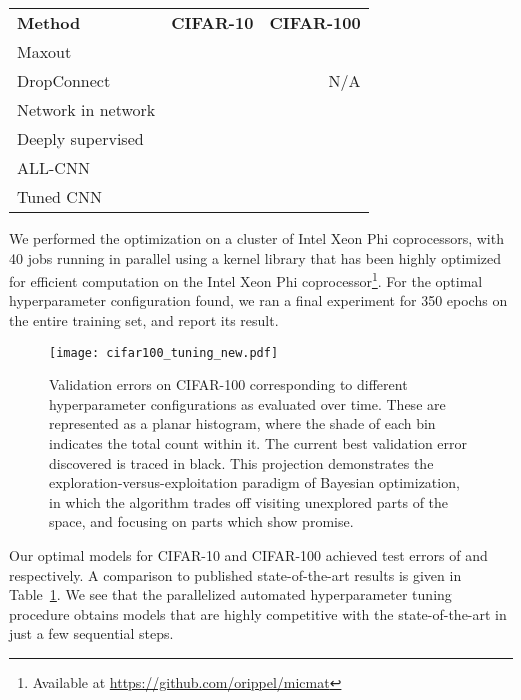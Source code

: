 \documentclass{article}
\begin{document}
\begin{table}[t!]
  \centering
  \begin{tabular}[b]{lrr}
    \toprule
    {\bf Method} & {\bf CIFAR-10} & {\bf CIFAR-100}\\\cmidrule(r){1-3}Maxout &  &  \\
    DropConnect &  & N/A \\
    Network in network &  &  \\
    Deeply supervised &  &  \\ALL-CNN &  &  \\\cmidrule(r){1-3}Tuned CNN &  &  \\
   \bottomrule \end{tabular}
  \captionsetup[table]{position=bottom}
  \label{tab:classification_results}
  \vspace{-9pt}
\end{table}

We performed the optimization on a cluster of Intel Xeon Phi coprocessors, with 40 jobs running in parallel using a kernel library that has been highly optimized for efficient computation on the Intel Xeon Phi coprocessor\footnote{Available at \url{https://github.com/orippel/micmat}}. For the optimal hyperparameter configuration found, we ran a final experiment for 350 epochs on the entire training set, and report its result.

\begin{figure}[t]
  \texttt{[image: cifar100\_tuning\_new.pdf]}\vspace{-9pt}
\caption{Validation errors on CIFAR-100 corresponding to different hyperparameter configurations as evaluated over time. These are represented as a planar histogram, where the shade of each bin indicates the total count within it. The current best validation error discovered is traced in black. This projection demonstrates the exploration-versus-exploitation paradigm of Bayesian optimization, in which the algorithm trades off visiting unexplored parts of the space, and focusing on parts which show promise.}
\label{fig:validation_errors}
\vspace{-9pt}
\end{figure}
Our optimal models for CIFAR-10 and CIFAR-100 achieved test errors of  and  respectively. A comparison to published state-of-the-art results \cite{GoodfellowWMCB13, WanZZLF13, LinCY13, Lee2014,DBLP:journals/corr/SpringenbergDBR14} is given in Table~\ref{tab:classification_results}.  We see that the parallelized automated hyperparameter tuning procedure obtains models that are highly competitive with the state-of-the-art in just a few sequential steps.
\end{document}
